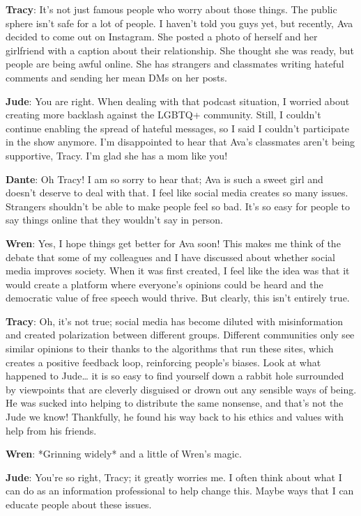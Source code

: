 \documentclass[
  letterpaper,
  DIV=11,
  numbers=noendperiod]{scrreprt}
\begin{document}
\textbf{Tracy}: It's not just famous people who worry about those
things. The public sphere isn't safe for a lot of people. I haven't told
you guys yet, but recently, Ava decided to come out on Instagram. She
posted a photo of herself and her girlfriend with a caption about their
relationship. She thought she was ready, but people are being awful
online. She has strangers and classmates writing hateful comments and
sending her mean DMs on her posts.

\textbf{Jude}: You are right. When dealing with that podcast situation,
I worried about creating more backlash against the LGBTQ+ community.
Still, I couldn't continue enabling the spread of hateful messages, so I
said I couldn't participate in the show anymore. I'm disappointed to
hear that Ava's classmates aren't being supportive, Tracy. I'm glad she
has a mom like you!

\textbf{Dante}: Oh Tracy! I am so sorry to hear that; Ava is such a
sweet girl and doesn't deserve to deal with that. I feel like social
media creates so many issues. Strangers shouldn't be able to make people
feel so bad. It's so easy for people to say things online that they
wouldn't say in person.

\textbf{Wren}: Yes, I hope things get better for Ava soon! This makes me
think of the debate that some of my colleagues and I have discussed
about whether social media improves society. When it was first created,
I feel like the idea was that it would create a platform where
everyone's opinions could be heard and the democratic value of free
speech would thrive. But clearly, this isn't entirely true.

\textbf{Tracy}: Oh, it's not true; social media has become diluted with
misinformation and created polarization between different groups.
Different communities only see similar opinions to their thanks to the
algorithms that run these sites, which creates a positive feedback loop,
reinforcing people's biases. Look at what happened to Jude\ldots{} it is
so easy to find yourself down a rabbit hole surrounded by viewpoints
that are cleverly disguised or drown out any sensible ways of being. He
was sucked into helping to distribute the same nonsense, and that's not
the Jude we know! Thankfully, he found his way back to his ethics and
values with help from his friends.

\textbf{Wren}: *Grinning widely* and a little of Wren's magic.

\textbf{Jude}: You're so right, Tracy; it greatly worries me. I often
think about what I can do as an information professional to help change
this. Maybe ways that I can educate people about these issues.
\end{document}
